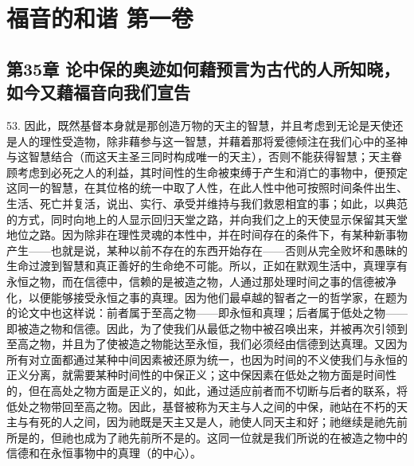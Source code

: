 
\section{福音的和谐 第一卷}


\subsection{第35章 论中保的奥迹如何藉预言为古代的人所知晓，如今又藉福音向我们宣告}

53. 因此，既然基督本身就是那创造万物的天主的智慧，并且考虑到无论是天使还是人的理性受造物，除非藉参与这一智慧，并藉着那将爱德倾注在我们心中的圣神与这智慧结合（而这天主圣三同时构成唯一的天主），否则不能获得智慧；天主眷顾考虑到必死之人的利益，其时间性的生命被束缚于产生和消亡的事物中，便预定这同一的智慧，在其位格的统一中取了人性，在此人性中他可按照时间条件出生、生活、死亡并复活，说出、实行、承受并维持与我们救恩相宜的事；如此，以典范的方式，同时向地上的人显示回归天堂之路，并向我们之上的天使显示保留其天堂地位之路。因为除非在理性灵魂的本性中，并在时间存在的条件下，有某种新事物产生——也就是说，某种以前不存在的东西开始存在——否则从完全败坏和愚昧的生命过渡到智慧和真正善好的生命绝不可能。所以，正如在默观生活中，真理享有永恒之物，而在信德中，信赖的是被造之物，人通过那处理时间之事的信德被净化，以便能够接受永恒之事的真理。因为他们最卓越的智者之一的哲学家，在题为的论文中也这样说：前者属于至高之物——即永恒和真理；后者属于低处之物——即被造之物和信德。因此，为了使我们从最低之物中被召唤出来，并被再次引领到至高之物，并且为了使被造之物能达至永恒，我们必须经由信德到达真理。又因为所有对立面都通过某种中间因素被还原为统一，也因为时间的不义使我们与永恒的正义分离，就需要某种时间性的中保正义；这中保因素在低处之物方面是时间性的，但在高处之物方面是正义的，如此，通过适应前者而不切断与后者的联系，将低处之物带回至高之物。因此，基督被称为天主与人之间的中保，祂站在不朽的天主与有死的人之间，因为祂既是天主又是人，祂使人同天主和好；祂继续是祂先前所是的，但祂也成为了祂先前所不是的。这同一位就是我们所说的在被造之物中的信德和在永恒事物中的真理（的中心）。\par

